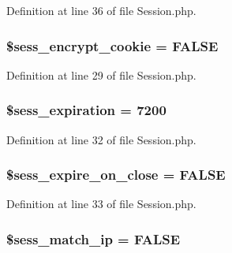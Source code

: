 Definition at line 36 of file Session.\-php.

\hypertarget{class_c_i___session_a6d32af5e9bd9b9105ae0820ed8a09495}{
\subsubsection[{\$sess\-\_\-encrypt\-\_\-cookie}]{\setlength{\rightskip}{0pt plus 5cm}\$sess\-\_\-encrypt\-\_\-cookie = F\-A\-L\-S\-E}}\label{class_c_i___session_a6d32af5e9bd9b9105ae0820ed8a09495}


Definition at line 29 of file Session.\-php.

\hypertarget{class_c_i___session_a3ef0fc3196a5fc8415939b69d158a488}{
\subsubsection[{\$sess\-\_\-expiration}]{\setlength{\rightskip}{0pt plus 5cm}\$sess\-\_\-expiration = 7200}}\label{class_c_i___session_a3ef0fc3196a5fc8415939b69d158a488}


Definition at line 32 of file Session.\-php.

\hypertarget{class_c_i___session_abd220b00e9d36c1e3296f9ddef681f01}{
\subsubsection[{\$sess\-\_\-expire\-\_\-on\-\_\-close}]{\setlength{\rightskip}{0pt plus 5cm}\$sess\-\_\-expire\-\_\-on\-\_\-close = F\-A\-L\-S\-E}}\label{class_c_i___session_abd220b00e9d36c1e3296f9ddef681f01}


Definition at line 33 of file Session.\-php.

\hypertarget{class_c_i___session_ac87480ccf2a450d6ef69dead9c7b01bb}{
\subsubsection[{\$sess\-\_\-match\-\_\-ip}]{\setlength{\rightskip}{0pt plus 5cm}\$sess\-\_\-match\-\_\-ip = F\-A\-L\-S\-E}}\label{class_c_i___session_ac87480ccf2a450d6ef69dead9c7b01bb}


